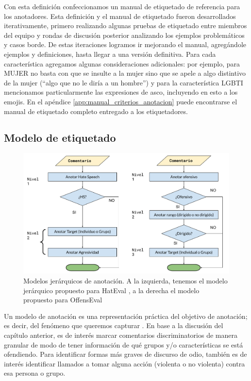 Con esta definición confeccionamos un manual de etiquetado de referencia para los anotadores. Esta definición y el manual de etiquetado fueron desarrollados iterativamente, primero realizando algunas pruebas de etiquetado entre miembros del equipo y rondas de discusión posterior analizando los ejemplos problemáticos y casos borde. De estas iteraciones logramos ir mejorando el manual, agregándole ejemplos y definiciones, hasta llegar a una versión definitiva. Para cada característica agregamos algunas consideraciones adicionales: por ejemplo, para MUJER no basta con que se insulte a la mujer sino que se apele a algo distintivo de la mujer (``algo que no le diría a un hombre'') y para la característica LGBTI mencionamos particularmente las expresiones de asco, incluyendo en esto a los emojis. En el apéndice \ref{app:manual_criterios_anotacion} puede encontrarse el manual de etiquetado completo entregado a los etiquetadores.



\subsection{Modelo de etiquetado}


\begin{figure}[t]
    \centering
    \includegraphics[width=\textwidth]{img/05/modelos_jerarquicos.pdf}
    \caption{Modelos jerárquicos de anotación. A la izquierda, tenemos el modelo jerárquico propuesto para HatEval \cite{hateval2019semeval}, a la derecha el modelo propuesto para OffensEval \cite{zampieri2019semeval2019}}
    \label{fig:modelos_offenseval_hateval}
\end{figure}


Un modelo de anotación es una representación práctica del objetivo de anotación; es decir, del fenómeno que queremos capturar \cite{pustejovsky2012natural}. En base a la discusión del capítulo anterior, es de interés marcar comentarios discriminatorios de manera granular de modo de tener información de qué grupos y/o características se está ofendiendo. Para identificar formas más graves de discurso de odio, también es de interés identificar llamados a tomar alguna acción (violenta o no violenta) contra esa persona o grupo.

